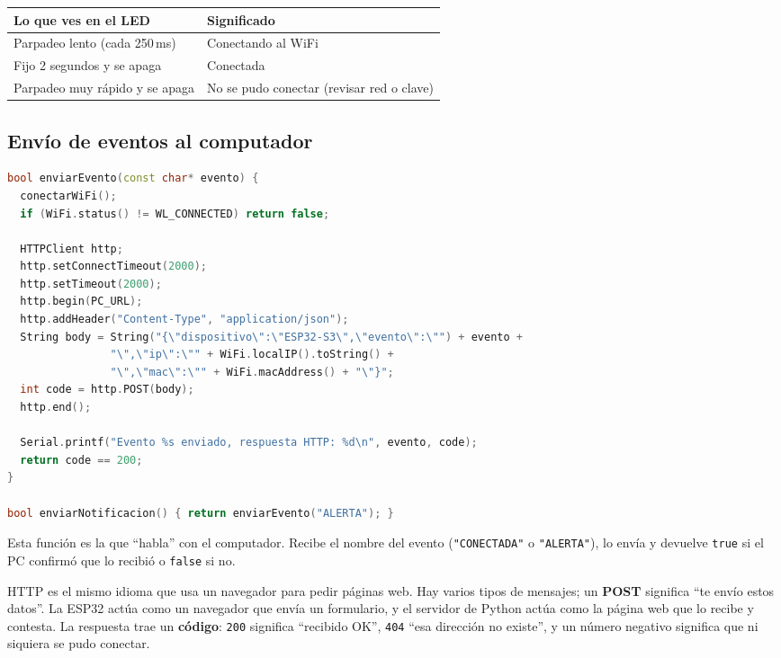 \documentclass[11pt,a4paper]{article}
\begin{document}
\begin{center}
\begin{tabular}{@{}ll@{}}
\toprule
\textbf{Lo que ves en el LED} & \textbf{Significado}\\
\midrule
Parpadeo lento (cada 250\,ms)   & Conectando al WiFi\\
Fijo 2 segundos y se apaga      & Conectada\\
Parpadeo muy rápido y se apaga  & No se pudo conectar (revisar red o clave)\\
\bottomrule
\end{tabular}
\end{center}

\subsection{Envío de eventos al computador}

\begin{lstlisting}[language=C++]
bool enviarEvento(const char* evento) {
  conectarWiFi();
  if (WiFi.status() != WL_CONNECTED) return false;

  HTTPClient http;
  http.setConnectTimeout(2000);
  http.setTimeout(2000);
  http.begin(PC_URL);
  http.addHeader("Content-Type", "application/json");
  String body = String("{\"dispositivo\":\"ESP32-S3\",\"evento\":\"") + evento +
                "\",\"ip\":\"" + WiFi.localIP().toString() +
                "\",\"mac\":\"" + WiFi.macAddress() + "\"}";
  int code = http.POST(body);
  http.end();

  Serial.printf("Evento %s enviado, respuesta HTTP: %d\n", evento, code);
  return code == 200;
}

bool enviarNotificacion() { return enviarEvento("ALERTA"); }
\end{lstlisting}

Esta función es la que ``habla'' con el computador. Recibe el nombre del evento
(\texttt{"CONECTADA"} o \texttt{"ALERTA"}), lo envía y devuelve
\texttt{true} si el PC confirmó que lo recibió o \texttt{false} si no.

\begin{idea}
HTTP es el mismo idioma que usa un navegador para pedir páginas web. Hay varios
tipos de mensajes; un \textbf{POST} significa ``te envío estos datos''. La ESP32
actúa como un navegador que envía un formulario, y el servidor de Python actúa
como la página web que lo recibe y contesta. La respuesta trae un
\textbf{código}: \texttt{200} significa ``recibido OK'', \texttt{404} ``esa
dirección no existe'', y un número negativo significa que ni siquiera se pudo
conectar.
\end{idea}
\end{document}
